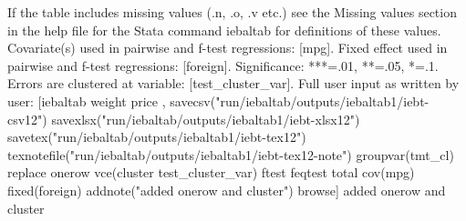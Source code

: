 If the table includes missing values (.n, .o, .v etc.) see the Missing values section in the help file for the Stata command iebaltab for definitions of these values. Covariate(s) used in pairwise and f-test regressions: [mpg]. Fixed effect used in pairwise and f-test regressions: [foreign]. Significance: ***=.01, **=.05, *=.1. Errors are clustered at variable: [test\_cluster\_var]. Full user input as written by user: [iebaltab weight price , savecsv("run/iebaltab/outputs/iebaltab1/iebt-csv12") savexlsx("run/iebaltab/outputs/iebaltab1/iebt-xlsx12") savetex("run/iebaltab/outputs/iebaltab1/iebt-tex12") texnotefile("run/iebaltab/outputs/iebaltab1/iebt-tex12-note") groupvar(tmt\_cl) replace onerow vce(cluster test\_cluster\_var) ftest feqtest total cov(mpg) fixed(foreign) addnote("added onerow and cluster") browse] added onerow and cluster

